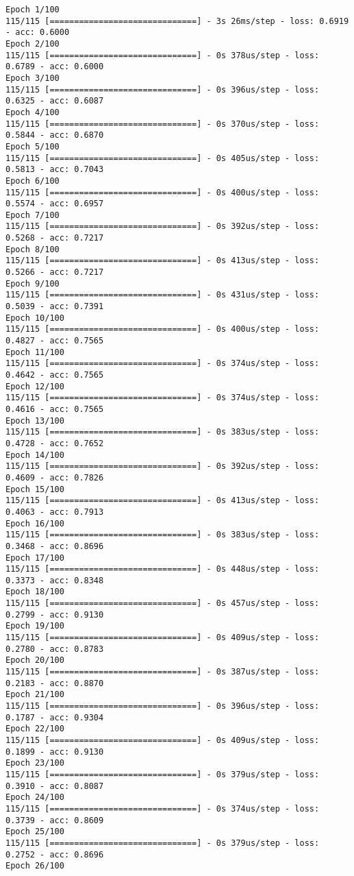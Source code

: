 \documentclass[11pt]{article}
\begin{document}
    \begin{Verbatim}[commandchars=\\\{\}]
Epoch 1/100
115/115 [==============================] - 3s 26ms/step - loss: 0.6919 - acc: 0.6000
Epoch 2/100
115/115 [==============================] - 0s 378us/step - loss: 0.6789 - acc: 0.6000
Epoch 3/100
115/115 [==============================] - 0s 396us/step - loss: 0.6325 - acc: 0.6087
Epoch 4/100
115/115 [==============================] - 0s 370us/step - loss: 0.5844 - acc: 0.6870
Epoch 5/100
115/115 [==============================] - 0s 405us/step - loss: 0.5813 - acc: 0.7043
Epoch 6/100
115/115 [==============================] - 0s 400us/step - loss: 0.5574 - acc: 0.6957
Epoch 7/100
115/115 [==============================] - 0s 392us/step - loss: 0.5268 - acc: 0.7217
Epoch 8/100
115/115 [==============================] - 0s 413us/step - loss: 0.5266 - acc: 0.7217
Epoch 9/100
115/115 [==============================] - 0s 431us/step - loss: 0.5039 - acc: 0.7391
Epoch 10/100
115/115 [==============================] - 0s 400us/step - loss: 0.4827 - acc: 0.7565
Epoch 11/100
115/115 [==============================] - 0s 374us/step - loss: 0.4642 - acc: 0.7565
Epoch 12/100
115/115 [==============================] - 0s 374us/step - loss: 0.4616 - acc: 0.7565
Epoch 13/100
115/115 [==============================] - 0s 383us/step - loss: 0.4728 - acc: 0.7652
Epoch 14/100
115/115 [==============================] - 0s 392us/step - loss: 0.4609 - acc: 0.7826
Epoch 15/100
115/115 [==============================] - 0s 413us/step - loss: 0.4063 - acc: 0.7913
Epoch 16/100
115/115 [==============================] - 0s 383us/step - loss: 0.3468 - acc: 0.8696
Epoch 17/100
115/115 [==============================] - 0s 448us/step - loss: 0.3373 - acc: 0.8348
Epoch 18/100
115/115 [==============================] - 0s 457us/step - loss: 0.2799 - acc: 0.9130
Epoch 19/100
115/115 [==============================] - 0s 409us/step - loss: 0.2780 - acc: 0.8783
Epoch 20/100
115/115 [==============================] - 0s 387us/step - loss: 0.2183 - acc: 0.8870
Epoch 21/100
115/115 [==============================] - 0s 396us/step - loss: 0.1787 - acc: 0.9304
Epoch 22/100
115/115 [==============================] - 0s 409us/step - loss: 0.1899 - acc: 0.9130
Epoch 23/100
115/115 [==============================] - 0s 379us/step - loss: 0.3910 - acc: 0.8087
Epoch 24/100
115/115 [==============================] - 0s 374us/step - loss: 0.3739 - acc: 0.8609
Epoch 25/100
115/115 [==============================] - 0s 379us/step - loss: 0.2752 - acc: 0.8696
Epoch 26/100

\end{Verbatim}
\end{document}
